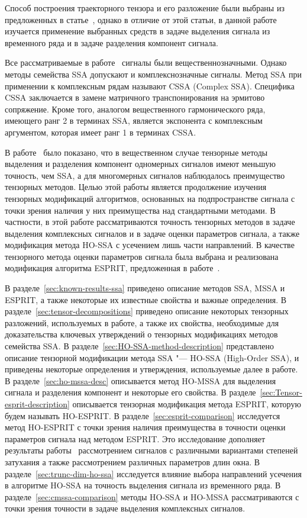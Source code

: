 \documentclass[specialist,
  substylefile=spbu_report.rtx,
subf,href,colorlinks=true, 12pt]{disser}
\theoremstyle{plain}
\theoremstyle{definition}
\theoremstyle{remark}
\begin{document}
Способ построения траекторного тензора и его разложение были
выбраны из предложенных в
статье~\cite{hosvd-hooi-separation}, однако в отличие от этой
статьи, в данной работе изучается применение
выбранных средств в задаче выделения сигнала из временного ряда и в
задаче разделения компонент сигнала.

Все рассматриваемые в работе~\cite{Thesis2024} сигналы были вещественнозначными.
Однако методы семейства SSA допускают и комплекснозначные сигналы.
Метод SSA при применении к комплексным рядам называют CSSA (Complex SSA).
Специфика CSSA заключается в замене матричного
транспонирования на эрмитово сопряжение.
Кроме того, аналогом вещественного гармонического ряда,
имеющего ранг 2 в терминах SSA, является
экспонента с комплексным аргументом, которая
имеет ранг 1 в терминах CSSA.

В работе~\cite{Thesis2024} было показано, что в
вещественном случае тензорные методы выделения
и разделения компонент одномерных сигналов имеют меньшую точность, чем SSA,
а для многомерных сигналов наблюдалось преимущество тензорных методов.
Целью этой работы является продолжение изучения тензорных модификаций
алгоритмов, основанных на подпространстве сигнала с точки зрения наличия
у них преимущества над стандартными методами.
В частности, в этой работе рассматриваются точность
тензорных методов в задаче выделения комплексных сигналов
и в задаче оценки параметров сигнала, а также модификация метода HO-SSA с
усечением лишь части направлений.
В качестве тензорного метода оценки параметров сигнала была выбрана и
реализована модификация алгоритма ESPRIT, предложенная в
работе~\cite{hosvd-hooi-separation}.

В разделе~\ref{sec:known-results-ssa} приведено описание методов
SSA, MSSA и ESPRIT, а также некоторые их
известные свойства и важные определения.
В разделе~\ref{sec:tensor-decompositions} приведено описание
некоторых тензорных разложений, используемых в работе,
а также их свойства, необходимые для доказательства ключевых утверждений о
тензорных модификациях методов семейства SSA.
В разделе~\ref{sec:HO-SSA-method-description}
представлено описание тензорной модификации метода SSA "--- HO-SSA
(High-Order SSA), и приведены некоторые определения и утверждения,
используемые далее в работе.
В разделе~\ref{sec:ho-mssa-desc}
описывается метод HO-MSSA для выделения сигнала и разделения
компонент и некоторые его свойства.
В разделе~\ref{sec:Tensor-esprit-description} описывается
тензорная модификация метода ESPRIT, которую будем называть
HO-ESPRIT.
В разделе~\ref{sec:esprit-comparison} исследуется метод
HO-ESPRIT с точки зрения наличия преимущества в точности
оценки параметров сигнала над методом ESPRIT.
Это исследование дополняет результаты работы~\cite{hosvd-hooi-separation}
рассмотрением сигналов с различными вариантами степеней затухания
а также рассмотрением различных параметров длин окна.
В разделе~\ref{sec:trunc-dim-ho-ssa} исследуется влияние
выбора направлений усечения в алгоритме HO-SSA на точность
выделения сигнала из временного ряда.
В разделе~\ref{sec:cmssa-comparison} методы HO-SSA и HO-MSSA
рассматриваются с точки зрения точности в задаче выделения
комплексных сигналов.
\end{document}
